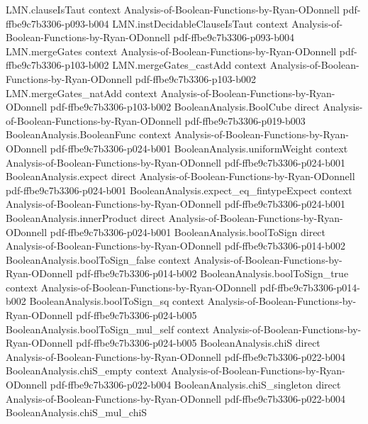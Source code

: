 \begin{theorem}
  {LMN.clauseIsTaut}
  {context}
  {Analysis-of-Boolean-Functions-by-Ryan-ODonnell}
  {pdf-ffbe9c7b3306-p093-b004}
\proofstep
  {LMN.instDecidableClauseIsTaut}
  {context}
  {Analysis-of-Boolean-Functions-by-Ryan-ODonnell}
  {pdf-ffbe9c7b3306-p093-b004}
\proofstep
  {LMN.mergeGates}
  {context}
  {Analysis-of-Boolean-Functions-by-Ryan-ODonnell}
  {pdf-ffbe9c7b3306-p103-b002}
\proofstep
  {LMN.mergeGates_castAdd}
  {context}
  {Analysis-of-Boolean-Functions-by-Ryan-ODonnell}
  {pdf-ffbe9c7b3306-p103-b002}
\proofstep
  {LMN.mergeGates_natAdd}
  {context}
  {Analysis-of-Boolean-Functions-by-Ryan-ODonnell}
  {pdf-ffbe9c7b3306-p103-b002}
\proofstep
  {BooleanAnalysis.BoolCube}
  {direct}
  {Analysis-of-Boolean-Functions-by-Ryan-ODonnell}
  {pdf-ffbe9c7b3306-p019-b003}
\proofstep
  {BooleanAnalysis.BooleanFunc}
  {context}
  {Analysis-of-Boolean-Functions-by-Ryan-ODonnell}
  {pdf-ffbe9c7b3306-p024-b001}
\proofstep
  {BooleanAnalysis.uniformWeight}
  {context}
  {Analysis-of-Boolean-Functions-by-Ryan-ODonnell}
  {pdf-ffbe9c7b3306-p024-b001}
\proofstep
  {BooleanAnalysis.expect}
  {direct}
  {Analysis-of-Boolean-Functions-by-Ryan-ODonnell}
  {pdf-ffbe9c7b3306-p024-b001}
\proofstep
  {BooleanAnalysis.expect_eq_fintypeExpect}
  {context}
  {Analysis-of-Boolean-Functions-by-Ryan-ODonnell}
  {pdf-ffbe9c7b3306-p024-b001}
\proofstep
  {BooleanAnalysis.innerProduct}
  {direct}
  {Analysis-of-Boolean-Functions-by-Ryan-ODonnell}
  {pdf-ffbe9c7b3306-p024-b001}
\proofstep
  {BooleanAnalysis.boolToSign}
  {direct}
  {Analysis-of-Boolean-Functions-by-Ryan-ODonnell}
  {pdf-ffbe9c7b3306-p014-b002}
\proofstep
  {BooleanAnalysis.boolToSign_false}
  {context}
  {Analysis-of-Boolean-Functions-by-Ryan-ODonnell}
  {pdf-ffbe9c7b3306-p014-b002}
\proofstep
  {BooleanAnalysis.boolToSign_true}
  {context}
  {Analysis-of-Boolean-Functions-by-Ryan-ODonnell}
  {pdf-ffbe9c7b3306-p014-b002}
\proofstep
  {BooleanAnalysis.boolToSign_sq}
  {context}
  {Analysis-of-Boolean-Functions-by-Ryan-ODonnell}
  {pdf-ffbe9c7b3306-p024-b005}
\proofstep
  {BooleanAnalysis.boolToSign_mul_self}
  {context}
  {Analysis-of-Boolean-Functions-by-Ryan-ODonnell}
  {pdf-ffbe9c7b3306-p024-b005}
\proofstep
  {BooleanAnalysis.chiS}
  {direct}
  {Analysis-of-Boolean-Functions-by-Ryan-ODonnell}
  {pdf-ffbe9c7b3306-p022-b004}
\proofstep
  {BooleanAnalysis.chiS_empty}
  {context}
  {Analysis-of-Boolean-Functions-by-Ryan-ODonnell}
  {pdf-ffbe9c7b3306-p022-b004}
\proofstep
  {BooleanAnalysis.chiS_singleton}
  {direct}
  {Analysis-of-Boolean-Functions-by-Ryan-ODonnell}
  {pdf-ffbe9c7b3306-p022-b004}
\proofstep
  {BooleanAnalysis.chiS_mul_chiS}

\end{theorem}
